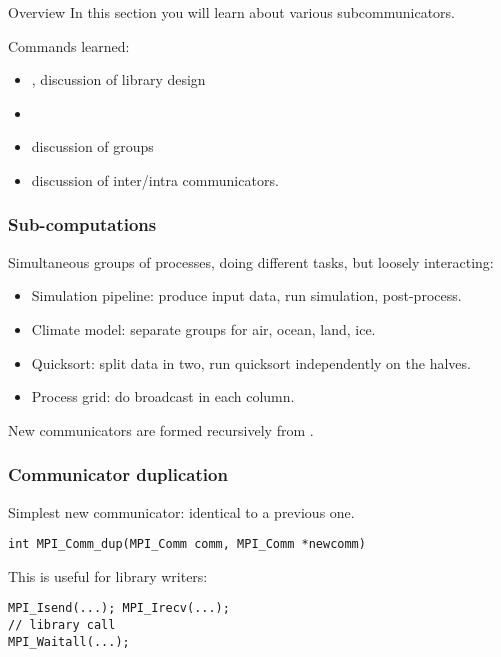 
\begin{frame}[containsverbatim]{Overview}
  In this section you will learn about various subcommunicators.

  Commands learned:
  \begin{itemize}
  \item {}, discussion of library design
  \item {}
  \item discussion of groups
  \item discussion of inter/intra communicators.
  \end{itemize}
\end{frame}


\begin{frame}[containsverbatim]\frametitle{Sub-computations}
  Simultaneous groups of processes, doing different tasks, but
  loosely interacting:
  \begin{itemize}
  \item Simulation pipeline: produce input data, run simulation, post-process.
  \item Climate model: separate groups for air, ocean, land, ice.
  \item Quicksort: split data in two, run quicksort independently on the halves.
  \item Process grid: do broadcast in each column.
  \end{itemize}
  New communicators are formed recursively from .
\end{frame}

\begin{frame}[containsverbatim]\frametitle{Communicator duplication}
Simplest new communicator: identical to a previous one.
\lstset{language=C++}
\begin{lstlisting}
int MPI_Comm_dup(MPI_Comm comm, MPI_Comm *newcomm)
\end{lstlisting}
This is useful for library writers:
\begin{lstlisting}
MPI_Isend(...); MPI_Irecv(...);
// library call
MPI_Waitall(...);  
\end{lstlisting}
\end{frame}

